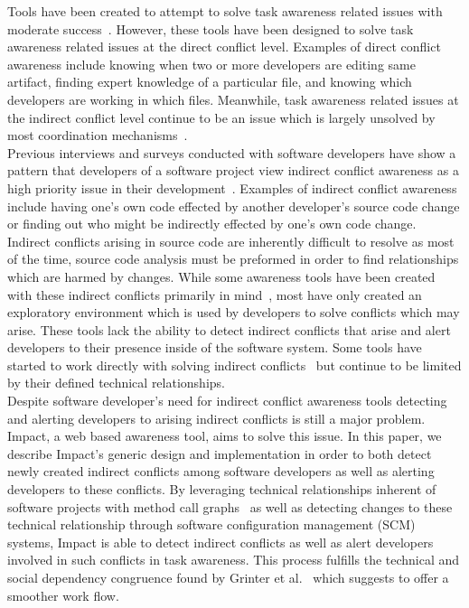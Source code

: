 \documentclass[conference]{IEEEtran}
\begin{document}
Tools have been created to attempt to solve task awareness related issues
with moderate success~\cite{Xiang:2008:ERT, Biehl:2007:FVD, Sarma:2009:TIV, Khurana:2009:PFC}. However, these tools have been designed 
to solve task awareness related issues at the direct conflict level. 
Examples of direct conflict awareness include knowing when two or more 
developers are  editing same artifact, finding expert knowledge of a
particular file, and knowing which developers are working in which files.
Meanwhile, task awareness related issues at the indirect conflict level
continue to be an issue which is largely unsolved by most coordination
mechanisms~\cite{Khurana:2009:PFC}.\\

Previous interviews and surveys conducted with software developers have 
show a pattern that developers of a software project view indirect conflict 
awareness  as a high priority issue in their development~\cite{Damian:2007:GSE, 
Halverson:2006:DTV, Begel:2010:CDE, Schroter:2012:TTF}. Examples 
of indirect conflict awareness
include having one's own code effected by another developer's source
code change or finding out who might be indirectly effected by one's
own code change. Indirect conflicts arising in source code are inherently
difficult to resolve as most of the time, source code analysis must
be preformed in order to find relationships which are harmed by changes.
While some awareness tools have been created with these indirect conflicts
primarily in mind~\cite{Begel:2010:CDE, Trainer:2005:BGT}, most have only 
created an exploratory environment which is used by developers to
solve conflicts which may arise. These tools lack the ability to detect
indirect conflicts that arise and alert developers to their presence 
inside of the software system. Some tools have started to work directly
with solving indirect conflicts~\cite{Sarma:2007:TSA} but continue
to be limited by their defined technical relationships.\\ 

Despite software developer's need for indirect conflict awareness tools
detecting and alerting developers to arising indirect conflicts is still a major
problem. Impact, a web based awareness
tool, aims to solve this issue. In this paper, we describe Impact's generic
design and implementation in order to both detect newly created
indirect conflicts among software developers as well as alerting developers
to these conflicts. By leveraging technical relationships inherent of 
software projects with method call graphs~\cite{Lakhotia:1993:CCM}
as well as detecting changes
to these technical relationship through software configuration management
(SCM) systems, Impact is able to detect indirect conflicts as well as
alert developers involved in such conflicts in task awareness. This process
fulfills the technical and social dependency congruence found by 
Grinter  et al.~\cite{Grinter:2003:RCW} which suggests to offer a smoother
work flow.\\
\end{document}
